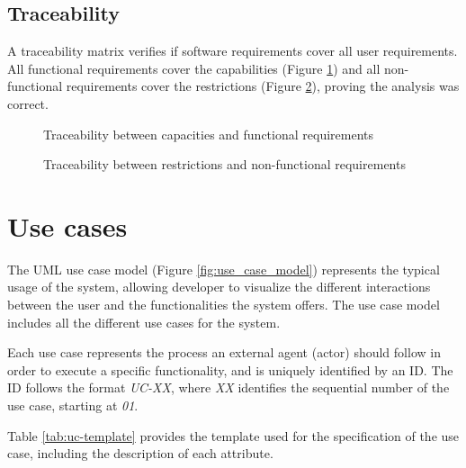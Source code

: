 \FloatBarrier


\subsection{Traceability}\label{subsec:req-traceability}
A traceability matrix verifies if software requirements cover all user requirements. All functional requirements cover the capabilities (Figure \ref{fig:ca-fc-traceability}) and all non-functional requirements cover the restrictions (Figure \ref{fig:re-nf-traceability}), proving the analysis was correct.

\begin{figure}[h]
  \centering
  \caption{Traceability between capacities and functional requirements}
  \label{fig:ca-fc-traceability}
\end{figure}

\begin{figure}[h]
  \centering
  \caption{Traceability between restrictions and non-functional requirements}
  \label{fig:re-nf-traceability}
\end{figure}

\FloatBarrier


\section{Use cases}\label{sec:use-cases}
The UML use case model \parencite{Cook2017} (Figure \ref{fig:use_case_model}) represents the typical usage of the system, allowing developer to visualize the different interactions between the user and the functionalities the system offers. The use case model includes all the different use cases for the system.


Each use case represents the process an external agent (actor) should follow in order to execute a specific functionality, and is uniquely identified by an ID. The ID follows the format \textit{UC-XX}, where \textit{XX} identifies the sequential number of the use case, starting at \textit{01}.

Table \ref{tab:uc-template} provides the template used for the specification of the use case, including the description of each attribute.

